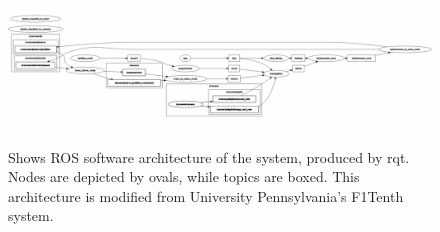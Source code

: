 \documentclass[conference]{IEEEtran}
\begin{document}

\begin{figure}
    \centering
    \includegraphics[width=\textwidth]{rqt_graph.png}
    \caption{Shows ROS software architecture of the system, produced by rqt. Nodes are depicted by ovals, while topics are boxed. This architecture is modified from University Pennsylvania's F1Tenth system.}
    \label{Figure 6}
\end{figure}













\end{document}
